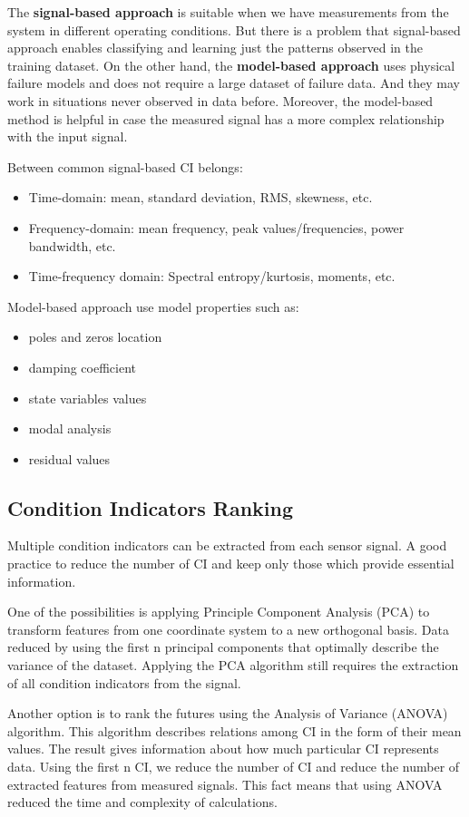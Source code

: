 The \textbf{signal-based approach} is suitable when we have measurements
from the system in different operating conditions.  But there is a problem
that signal-based approach enables classifying and learning just the
patterns observed in the training dataset.  On the other hand, the
\textbf{model-based approach} uses physical failure models and does not
require a large dataset of failure data. And they may work in situations
never observed in data before. Moreover, the model-based method is helpful
in case the measured signal has a more complex relationship with the input
signal.

Between common signal-based CI belongs:
\begin{itemize}
    \item Time-domain: mean, standard deviation, RMS, skewness, etc. 
    \item Frequency-domain: mean frequency, peak values/frequencies, power
        bandwidth, etc. 
    \item Time-frequency domain: Spectral entropy/kurtosis, moments, etc. 
\end{itemize}

Model-based approach use model properties such as:
\begin{itemize}
    \item poles and zeros location
    \item damping coefficient
    \item state variables values
    \item modal analysis
    \item residual values
\end{itemize}

\subsection{Condition Indicators Ranking}\label{sec:ci_ranking}
Multiple condition indicators can be extracted from each sensor signal.  A
good practice to reduce the number of CI and keep only those which provide
essential information. 

One of the possibilities is applying Principle Component Analysis (PCA) to
transform features from one coordinate system to a new orthogonal basis.
Data reduced by using the first n principal components that optimally
describe the variance of the dataset. Applying the PCA algorithm still
requires the extraction of all condition indicators from the signal.

Another option is to rank the futures using the Analysis of Variance
(ANOVA) algorithm. This algorithm describes relations among CI in the form
of their mean values. The result gives information about how much
particular CI represents data. Using the first n CI, we reduce the number
of CI and reduce the number of extracted features from measured signals.
This fact means that using ANOVA reduced the time and complexity of
calculations.

